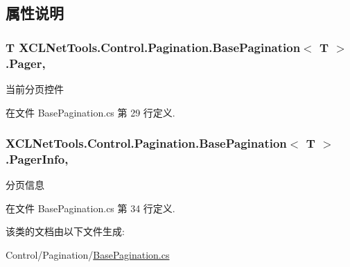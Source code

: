 \subsection{属性说明}
\hypertarget{class_x_c_l_net_tools_1_1_control_1_1_pagination_1_1_base_pagination_3_01_t_01_4_ae0cfdba3ea23387da4b851c4d695d0a0}{
\subsubsection[{Pager}]{\setlength{\rightskip}{0pt plus 5cm}T X\-C\-L\-Net\-Tools.\-Control.\-Pagination.\-Base\-Pagination$<$ T $>$.Pager\hspace{0.3cm}{\ttfamily [get]}, {\ttfamily [set]}}}\label{class_x_c_l_net_tools_1_1_control_1_1_pagination_1_1_base_pagination_3_01_t_01_4_ae0cfdba3ea23387da4b851c4d695d0a0}


当前分页控件 



在文件 Base\-Pagination.\-cs 第 29 行定义.

\hypertarget{class_x_c_l_net_tools_1_1_control_1_1_pagination_1_1_base_pagination_3_01_t_01_4_ae27d645cd692bb7471bc6236c59496a3}{
\subsubsection[{Pager\-Info}]{ X\-C\-L\-Net\-Tools.\-Control.\-Pagination.\-Base\-Pagination$<$ T $>$.Pager\-Info\hspace{0.3cm}{\ttfamily [get]}, {\ttfamily [set]}}}\label{class_x_c_l_net_tools_1_1_control_1_1_pagination_1_1_base_pagination_3_01_t_01_4_ae27d645cd692bb7471bc6236c59496a3}


分页信息 



在文件 Base\-Pagination.\-cs 第 34 行定义.



该类的文档由以下文件生成\-:\begin{DoxyCompactItemize}
\item 
Control/\-Pagination/\hyperlink{_base_pagination_8cs}{Base\-Pagination.\-cs}\end{DoxyCompactItemize}
